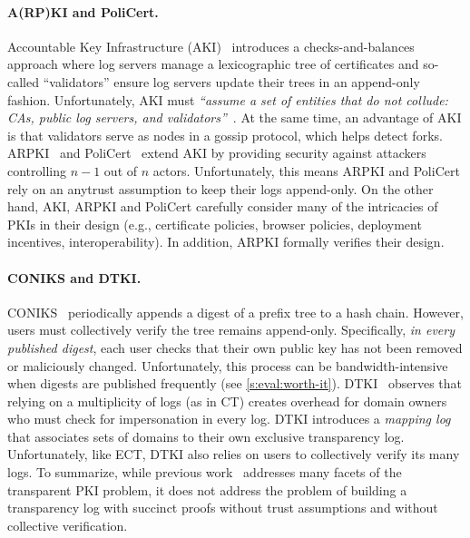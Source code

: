 \paragraph{A(RP)KI and PoliCert.}
Accountable Key Infrastructure (AKI)~\cite{aki} introduces a checks-and-balances approach where log servers manage a lexicographic tree of certificates and so-called ``validators'' ensure log servers update their trees in an append-only fashion.
Unfortunately, AKI must \textit{``assume a set of entities that do not collude: CAs, public log servers, and validators''}~\cite{aki}. 
At the same time, an advantage of AKI is that validators serve as nodes in a gossip protocol, which helps detect forks.
ARPKI~\cite{arpki} and PoliCert~\cite{policert} extend AKI by providing security against attackers controlling $n-1$ out of $n$ actors.
Unfortunately, this means ARPKI and PoliCert rely on an anytrust assumption to keep their logs append-only.
On the other hand, AKI, ARPKI and PoliCert carefully consider many of the intricacies of PKIs in their design (e.g., certificate policies, browser policies, deployment incentives, interoperability).
In addition, ARPKI formally verifies their design.

\paragraph{CONIKS and DTKI.}
CONIKS~\cite{coniks} periodically appends a digest of a prefix tree to a hash chain.
However, users must collectively verify the tree remains append-only.
Specifically, \textit{in every published digest}, each user checks that their own public key has not been removed or maliciously changed.
Unfortunately, this process can be bandwidth-intensive when digests are published frequently (see \cref{s:eval:worth-it}).
DTKI~\cite{dtki} observes that relying on a multiplicity of logs (as in CT) creates overhead for domain owners who must check for impersonation in every log.
DTKI introduces a \textit{mapping log} that associates sets of domains to their own exclusive transparency log.
Unfortunately, like ECT, DTKI also relies on users to collectively verify its many logs.
To summarize, while previous work~\cite{aki,arpki,policert,dtki} addresses many facets of the transparent PKI problem, it does not address the problem of building a transparency log with succinct proofs without trust assumptions and without collective verification.

